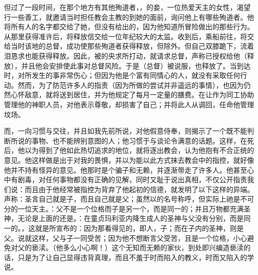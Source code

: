 但过了一段时间，在那个地方有其他殉道者，，的妾，一位热爱天主的女性，渴望行一些善工，就邀请当时担任教会主教的到她的面前，询问他上有哪些殉道者。他将所有人的名字都交给了她，但没有给出的，因为他知道所冒险做出的那些行为。从那里获得准许后，将释放信交给一位年纪较大的太监。收到后，乘船前往，将交给当时该地的总督，成功使那些殉道者获得释放，但除外。但自己双膝跪下，流着泪恳求也能获得释放。因此，被的央求所打动，就请求总督，声称已授权给他（释放），并且他会安排使此事对总督风险。于是（总督）被说服，也释放了。当到达时，对所发生的事非常伤心；但因为他是个富有同情心的人，就没有采取任何行动。然而，为了防范许多人的指责（因为所做的尝试并非遥远的事情），也因为仍然心怀敌意，就将送到居住，并为他规定了每月一定量的膳费。在让作为同工协助管理他的神职人员，对他表示尊敬，却损害了自己；并将此人从调回，任命他管理坟场。\par

而，一向习惯与交往，并且如我先前所说，对他假意侍奉，则揭示了一个既不能判断所说的事物、也不能辨别意图的人；他习惯于与谈论令满意的话题。这样，在死后，他以为得到了他如此热切追求的地位，就将逐出教会，认为他抱有不合正统的意见。他这样做是出于对我的畏惧，并以为能以此方式抹去教会中的指控，就好像他并不持有怪异的意见。他那时是个骗子和无赖，并逐渐带走了许多人。他甚至心中有剧毒，对任何事物都没有正确的见解，同时又耻于说出真相，不仅公开指责我们说：而且由于他经常被指控为背弃了他起初的信德，就发明了以下这样的异端。声称：圣言自己就是子，而且自己就是父；虽然以的名号称呼，但实际上祂是不可分的一位天主。：父不是一个位格而子是另一个，而是同一的；并且万物都充满圣神，无论是上面的还是。：在童贞玛利亚内降生成人的圣神与父没有分别，而是同一的。，这就是所宣布的：因为那看得见的，即人，子；而在子内的圣神，则是父。说就这样，父与子一同受苦；因为他不想断言父受苦，且是一个位格，小心避免对父的亵渎。（他多么小心啊！）这个无知而无赖的家伙，到处即兴编造亵渎的话，只是为了让自己显得违背真理，而且不羞于时而陷入的教义，时而又陷入的学说。\par

